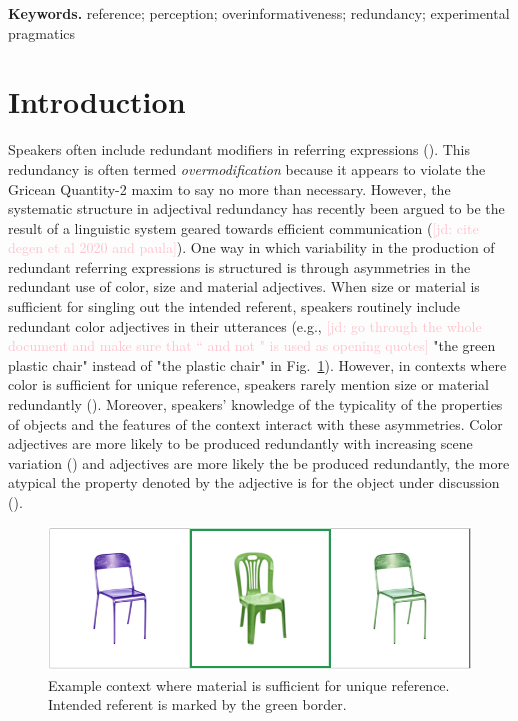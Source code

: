 \documentclass[12pt,letterpaper]{article}
\newcommand{\jd}[1]{\textcolor{Pink}{[jd: #1]}}
\newenvironment{keywords}{%
\vspace{.5em}
\noindent\begin{minipage}{1\textwidth}
\setlength{\leftskip}{0.4in}
\setlength{\rightskip}{0.4in}
\textbf{Keywords.}}
{\end{minipage}}
\begin{document}
\begin{keywords} %
reference; perception; overinformativeness; redundancy; experimental pragmatics
\end{keywords}

\section{Introduction} 

Speakers often include redundant modifiers in referring expressions  (\citealt{Pechmann1989,GattEtAl2011,ArtsEtAl2011,KoolenEtAl2013}). This redundancy is often termed \emph{overmodification} because it appears to violate the Gricean Quantity-2 maxim to say no more than necessary. However, the systematic structure in  adjectival redundancy has recently been argued to be the result of a linguistic system geared towards efficient communication (\jd{cite degen et al 2020 and paula}). One way in which variability in the production of redundant referring expressions is structured is through asymmetries in the redundant use of color, size and material adjectives. When size or material is sufficient for singling out the intended referent, speakers routinely include redundant color adjectives in their utterances (e.g., \jd{go through the whole document and make sure that `` and not " is used as opening quotes} "the green plastic chair" instead of "the plastic chair" in Fig.~\ref{fig:chairs}). However, in contexts where color is sufficient for unique reference, speakers rarely mention size or material redundantly (\citealt{Pechmann1989, Sedivy2003, GattEtAl2011, RubioFernandez2016, DegenEtAl2020}). Moreover, speakers' knowledge of the typicality of the properties of objects and the features of the context interact with these asymmetries. Color adjectives are more likely to be produced redundantly with increasing scene variation (\citealt{DegenEtAl2020, DaviesKatsos2013, KoolenEtAl2013}) and adjectives are more likely the be produced redundantly, the more atypical the property denoted by the adjective is for the object under discussion (\citealt{DegenEtAl2020, WesterbeekEtAl2015, Mitchell2013}).

\begin{figure}[ht]
   \centering
   \includegraphics[width=.7\textwidth]{img/chairs.png}
   \caption{Example context where material is sufficient for unique reference. Intended referent is marked by the green border.}
   \label{fig:chairs}
\end{figure}
\end{document}
